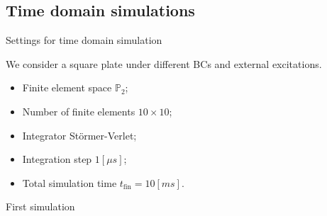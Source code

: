 \documentclass{beamer}
\begin{document}
\subsection{Time domain simulations}

\begin{frame}{Settings for time domain simulation}

We consider a square plate under different BCs and external excitations.

\begin{itemize}
\item Finite element space $\mathbb{P}_2$;
\item Number of finite elements $10 \times 10$;
\item Integrator St\"ormer-Verlet;
\item Integration step $1 [\mu s]$;
\item Total simulation time $t_{\text{fin}} = 10 [ms]$. 
\end{itemize}

\end{frame}

\begin{frame}{First simulation}
\begin{center}


\end{center}
\end{frame}
\end{document}
